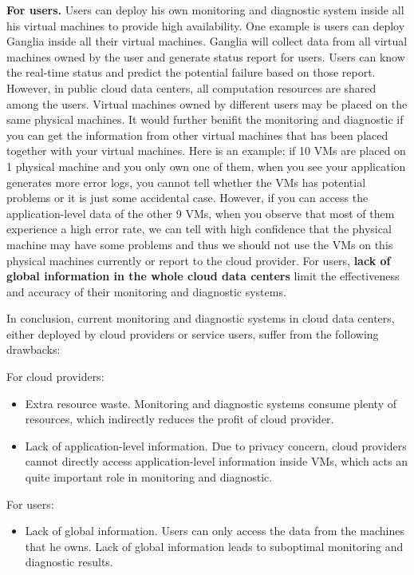 \documentclass[11px]{article}
\begin{document}
\textbf{For users.}
Users can deploy his own monitoring and diagnostic system inside all his virtual machines to provide high availability. One example is users can deploy Ganglia\cite{url/ganglia} inside all their virtual machines. Ganglia will collect data from all virtual machines owned by the user and generate status report for users. Users can know the real-time status and predict the potential failure based on those report. However, in public cloud data centers, all computation resources are shared among the users. Virtual machines owned by different users may be placed on the same physical machines\cite{infocom/lets_stay_together}. It would further benifit the monitoring and diagnostic if you can get the information from other virtual machines that has been placed together with your virtual machines. Here is an example: if 10 VMs are placed on 1 physical machine and you only own one of them, when you see your application generates more error logs, you cannot tell whether the VMs has potential problems or it is just some accidental case. However, if you can access the application-level data of the other 9 VMs, when you observe that most of them experience a high error rate, we can tell with high confidence that the physical machine may have some problems and thus we should not use the VMs on this physical machines currently or report to the cloud provider. For users, \textbf{lack of global information in the whole cloud data centers} limit the effectiveness and accuracy of their monitoring and diagnostic systems.

In conclusion, current monitoring and diagnostic systems in cloud data centers, either deployed by cloud providers or service users, suffer from the following drawbacks:

For cloud providers:
\begin{itemize}
	\item Extra resource waste. Monitoring and diagnostic systems consume plenty of resources, which indirectly reduces the profit of cloud provider.
	\item Lack of application-level information. Due to privacy concern, cloud providers cannot directly access application-level information inside VMs, which acts an quite important role in monitoring and diagnostic.
\end{itemize}

For users:
\begin{itemize}
	\item Lack of global information. Users can only access the data from the machines that he owns. Lack of global information leads to suboptimal monitoring and diagnostic results.
\end{itemize}
\end{document}
